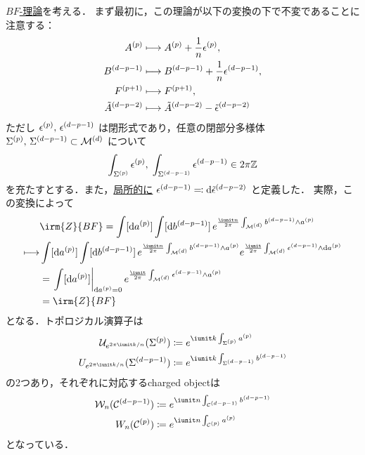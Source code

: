 \documentclass[TQFT_main]{subfiles}
\begin{document}
\hyperref[def:BF]{$BF$-理論}を考える．
まず最初に，この理論が以下の変換の下で不変であることに注意する：
\begin{align}
    A^{(p)} &\longmapsto A^{(p)} + \frac{1}{n} \epsilon^{(p)}, \\
    B^{(d-p-1)} &\longmapsto B^{(d-p-1)} + \frac{1}{n} \epsilon^{(d-p-1)}, \\
    F^{(p+1)} &\longmapsto F^{(p+1)}, \\
    \tilde{A}^{(d-p-2)} &\longmapsto \tilde{A}^{(d-p-2)} - \tilde{\epsilon}^{(d-p-2)}
\end{align}
ただし $\epsilon^{(p)},\, \epsilon^{(d-p-1)}$ は閉形式であり，任意の閉部分多様体 $\Sigma^{(p)},\, \Sigma^{(d-p-1)} \subset \mathcal{M}^{(d)}$ について
\begin{align}
    \int_{\Sigma^{(p)}} \epsilon^{(p)},\; \int_{\Sigma^{(d-p-1)}} \epsilon^{(d-p-1)} \in 2\pi \mathbb{Z}
\end{align}
を充たすとする．また，\underline{局所的に} $\epsilon^{(d-p-1)} \eqqcolon \dd{\tilde{\epsilon}^{(d-p-2)}}$ と定義した．
実際，この変換によって
\begin{align}
    &\irm{Z}{BF} 
    = \int [\dd{\hg{a}{p}}] \int [\dd{\hg{b}{d-p-1}}]\, e^{\frac{\iunit n}{2\pi} \int_{\mfdcal{M}{d}} \hg{b}{d-p-1} \wedge \hg{a}{p}} \\
    \lmto 
    & \int [\dd{\hg{a}{p}}] \int [\dd{\hg{b}{d-p-1}}]\, e^{\frac{\iunit n}{2\pi} \int_{\mfdcal{M}{d}} \hg{b}{d-p-1} \wedge \hg{a}{p}} e^{\frac{\iunit}{2\pi} \int_{\mfdcal{M}{d}} \hg{\epsilon}{d-p-1} \wedge \dd{\hg{a}{p}}} \\
    &= \eval{\int [\dd{\hg{a}{p}}]}_{\dd{\hg{a}{p}} = 0} e^{\frac{\iunit}{2\pi} \int_{\mfdcal{M}{d}} \hg{\epsilon}{d-p-1} \wedge \hg{a}{p}} \\
    &= \irm{Z}{BF} 
\end{align}
となる．トポロジカル演算子は
\begin{align}
    \mathcal{U}_{e^{2\pi \iunit k/n}}(\mfd{\Sigma}{p}) &\coloneqq e^{\iunit k \int_{\mfd{\Sigma}{p}} \hg{a}{p}} \\
    U_{e^{2\pi \iunit k/n}}(\mfd{\Sigma}{d-p-1}) &\coloneqq e^{\iunit k \int_{\mfd{\Sigma}{d-p-1}} \hg{b}{d-p-1}}
\end{align}
の2つあり，それぞれに対応するcharged objectは
\begin{align}
    \mathcal{W}_n (\mfdcal{C}{d-p-1}) &\coloneqq e^{\iunit n \int_{\mfdcal{C}{d-p-1}} \hg{b}{d-p-1}} \\
    W_n (\mfdcal{C}{p}) &\coloneqq e^{\iunit n \int_{\mfdcal{C}{p}} \hg{a}{p}}
\end{align}
となっている．
\end{document}
